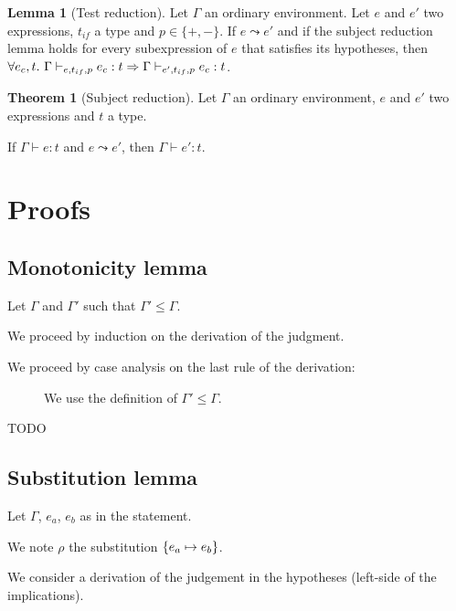 \documentclass[a4paper]{article}
\theoremstyle{definition}
\newtheorem{theorem}{Theorem}
\newtheorem{lemma}{Lemma}
\begin{document}
        \begin{lemma}[Test reduction]
          Let $\Gamma$ an ordinary environment. Let $e$ and $e'$ two expressions, $t_{if}$ a type and $p \in \{+,-\}$.
          If $e \leadsto e'$ and if the subject reduction lemma holds for every subexpression of $e$ that satisfies its hypotheses,
          then $\forall e_c,t.\ \Gamma \cvdash p e {t_{if}} e_c:t \Rightarrow \Gamma \cvdash p {e'} {t_{if}} e_c:t$.
        \end{lemma}

        \begin{theorem}[Subject reduction]
          Let $\Gamma$ an ordinary environment, $e$ and $e'$ two expressions and $t$ a type.

          If $\Gamma\vdash e:t$ and $e\leadsto e'$, then $\Gamma\vdash e':t$.
        \end{theorem}

        \section{Proofs}

        \subsection{Monotonicity lemma}

        Let $\Gamma$ and $\Gamma'$ such that $\Gamma' \leq \Gamma$.

        We proceed by induction on the derivation of the judgment.

        We proceed by case analysis on the last rule of the derivation:
        
        \begin{description}
          \item[] We use the definition of $\Gamma' \leq \Gamma$.
          \item[TODO] 
        \end{description}

        \subsection{Substitution lemma}

        Let $\Gamma$, $e_a$, $e_b$ as in the statement.

        We note $\rho$ the substitution $\subst {e_a} {e_b}$.

        We consider a derivation of the judgement in the hypotheses (left-side of the implications).
\end{document}
